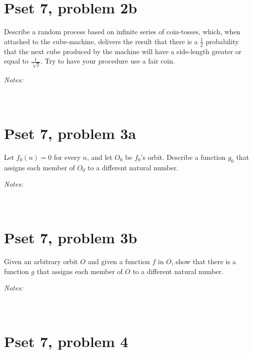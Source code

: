 \documentclass[justified]{tufte-handout}
\newcommand{\bfw}{\begin{fullwidth}}
\newcommand{\efw}{\end{fullwidth}}
\begin{document}
\section{Pset 7, problem 2b}

\noindent\bfw Describe a random process based on infinite series of coin-tosses, which, when attached to the cube-machine, delivers the result that there is a $\frac{1}{2}$ probability that the next cube produced by the machine will have a side-length greater or equal to $\frac{1}{\sqrt[3]{2}}$. Try to have your procedure use a fair coin.\efw

\noindent \emph{Notes:}  \underline{\hspace{15.82cm}}\\\\\underline{\hspace{16.85cm}}\\

\section{Pset 7, problem 3a}

\noindent\bfw Let $f_0(n) = 0$ for every $n$, and let $O_0$ be $f_0$'s orbit. Describe a function $g_0$ that assigns each member of $O_0$ to a different natural number.\efw

\noindent \emph{Notes:}  \underline{\hspace{15.82cm}}\\\\\underline{\hspace{16.85cm}}\\

\section{Pset 7, problem 3b}

\noindent\bfw Given an arbitrary orbit $O$ and given a function $f$ in $O$, show that there is a function $g$ that assigns each member of $O$ to a different natural number.\efw

\noindent \emph{Notes:}  \underline{\hspace{15.82cm}}\\\\\underline{\hspace{16.85cm}}\\

\section{Pset 7, problem 4}
\end{document}
